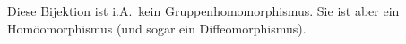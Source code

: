 \begin{warning}
  Diese Bijektion ist i.A.\ kein Gruppenhomomorphismus.
  Sie ist aber ein Homöomorphismus (und sogar ein Diffeomorphismus).
\end{warning}







